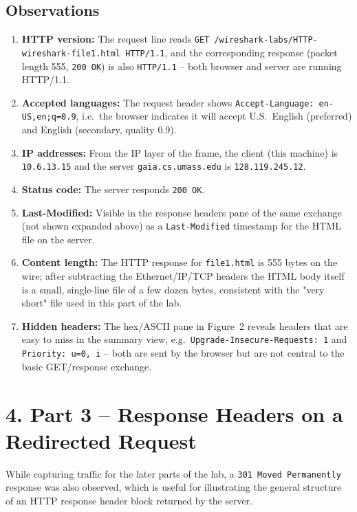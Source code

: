 \documentclass[11pt]{article}
\begin{document}
\subsection*{Observations}
\begin{enumerate}
  \item \textbf{HTTP version:} The request line reads \texttt{GET /wireshark-labs/HTTP-\allowbreak
        wireshark-file1.html HTTP/1.1}, and the corresponding response (packet length 555,
        \texttt{200 OK}) is also \texttt{HTTP/1.1} -- both browser and server are running
        HTTP/1.1.
  \item \textbf{Accepted languages:} The request header shows
        \texttt{Accept-Language: en-US,en;q=0.9}, i.e.\ the browser indicates it will accept
        U.S.\ English (preferred) and English (secondary, quality 0.9).
  \item \textbf{IP addresses:} From the IP layer of the frame, the client (this machine) is
        \texttt{10.6.13.15} and the server \texttt{gaia.cs.umass.edu} is \texttt{128.119.245.12}.
  \item \textbf{Status code:} The server responds \texttt{200 OK}.
  \item \textbf{Last-Modified:} Visible in the response headers pane of the same exchange (not
        shown expanded above) as a \texttt{Last-Modified} timestamp for the HTML file on the
        server.
  \item \textbf{Content length:} The HTTP response for \texttt{file1.html} is 555 bytes on the
        wire; after subtracting the Ethernet/IP/TCP headers the HTML body itself is a small,
        single-line file of a few dozen bytes, consistent with the "very short" file used in this
        part of the lab.
  \item \textbf{Hidden headers:} The hex/ASCII pane in Figure~2 reveals headers that are easy to
        miss in the summary view, e.g.\ \texttt{Upgrade-Insecure-Requests: 1} and
        \texttt{Priority: u=0, i} -- both are sent by the browser but are not central to the
        basic GET/response exchange.
\end{enumerate}

\section*{4. Part 3 -- Response Headers on a Redirected Request}
While capturing traffic for the later parts of the lab, a \texttt{301 Moved Permanently}
response was also observed, which is useful for illustrating the general structure of an HTTP
response header block returned by the server.
\end{document}
